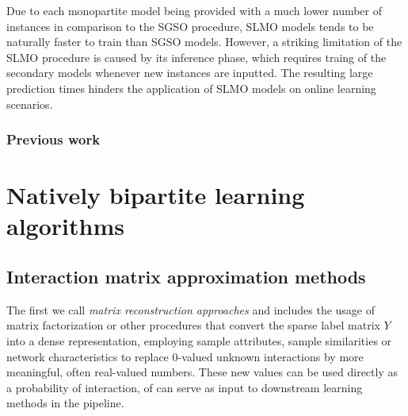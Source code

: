 Due to each monopartite model being provided with a much lower number of instances in comparison to the SGSO procedure, SLMO models tends to be naturally faster to train than SGSO models. However, a striking limitation of the SLMO procedure is caused by its inference phase, which requires traing of the secondary models whenever new instances are inputted. The resulting large prediction times hinders the application of SLMO models on online learning scenarios.






\subsubsection{Previous work}
\label{sec:slmo_previous_work}


\section{Natively bipartite learning algorithms}
\label{sec:native_bipartite_algorithms}

\subsection{Interaction matrix approximation methods}

The first we call \emph{matrix reconstruction approaches} and
includes the usage of matrix factorization or other procedures that convert the
sparse label matrix $Y$ into a dense representation, employing sample
attributes, sample similarities or network characteristics to replace 0-valued
unknown interactions by more meaningful, often real-valued numbers. These new
values can be used directly as a probability of interaction, of can serve as
input to downstream learning methods in the pipeline.

